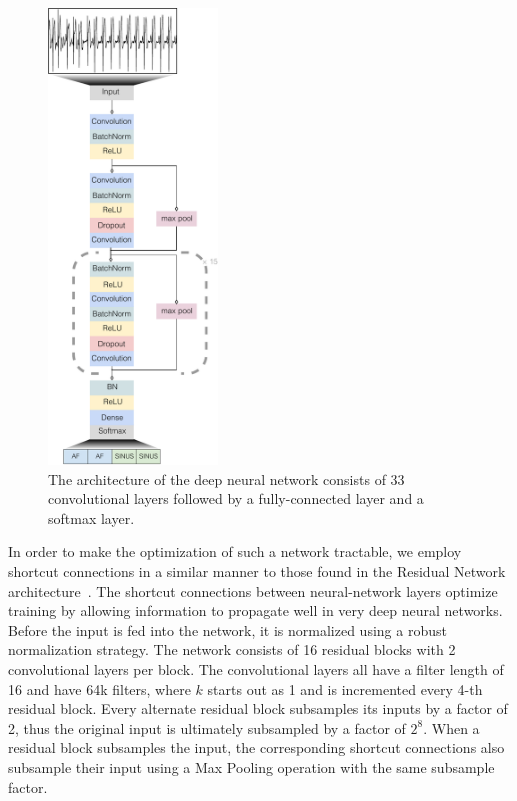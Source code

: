 \begin{figure}
\centering
\includegraphics[width=0.4\textwidth]{arrhythmias/figures/ecg_network_full.pdf}
\caption{The architecture of the deep neural network consists of 33
         convolutional layers followed by a fully-connected layer and
         a softmax layer.}
\label{fig:arrhythmias:net}
\end{figure}

In order to make the optimization of such a network tractable, we employ
shortcut connections in a similar manner to those found in the Residual Network
architecture~\cite{he2016identity}. The shortcut connections between
neural-network layers optimize training by allowing information to propagate
well in very deep neural networks. Before the input is fed into the network, it
is normalized using a robust normalization strategy. The network consists of
16 residual blocks with 2 convolutional layers per block. The convolutional
layers all have a filter length of 16 and have 64k filters, where $k$
starts out as 1 and is incremented every 4-th residual block. Every
alternate residual block subsamples its inputs by a factor of 2, thus the
original input is ultimately subsampled by a factor of $2^8$. When a residual
block subsamples the input, the corresponding shortcut connections also
subsample their input using a Max Pooling operation with the same subsample
factor. 

